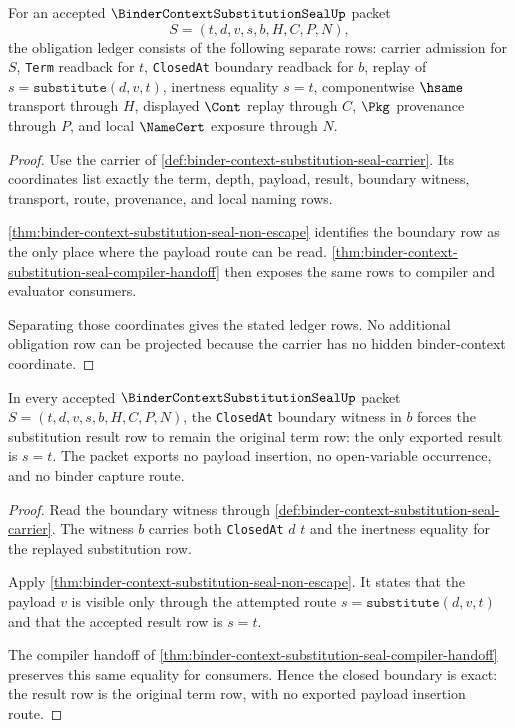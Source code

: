\begin{theorem}
\label{thm:binder-context-substitution-seal-obligation-rows}
For an accepted $\BinderContextSubstitutionSealUp$ packet
$$
S=(t,d,v,s,b,H,C,P,N),
$$
the obligation ledger consists of the following separate rows: carrier admission for $S$, \texttt{Term} readback for $t$, \texttt{ClosedAt} boundary readback for $b$, replay of $s=\texttt{substitute}(d,v,t)$, inertness equality $s=t$, componentwise $\hsame$ transport through $H$, displayed $\Cont$ replay through $C$, $\Pkg$ provenance through $P$, and local $\NameCert$ exposure through $N$.
\end{theorem}
\begin{proof}
Use the carrier of \autoref{def:binder-context-substitution-seal-carrier}. Its coordinates list exactly the term, depth, payload, result, boundary witness, transport, route, provenance, and local naming rows.

\autoref{thm:binder-context-substitution-seal-non-escape} identifies the boundary row as the only place where the payload route can be read. \autoref{thm:binder-context-substitution-seal-compiler-handoff} then exposes the same rows to compiler and evaluator consumers.

Separating those coordinates gives the stated ledger rows. No additional obligation row can be projected because the carrier has no hidden binder-context coordinate.
\end{proof}

\begin{theorem}
\label{thm:binder-context-substitution-seal-closed-boundary-exactness}
In every accepted $\BinderContextSubstitutionSealUp$ packet $S=(t,d,v,s,b,H,C,P,N)$, the \texttt{ClosedAt} boundary witness in $b$ forces the substitution result row to remain the original term row: the only exported result is $s=t$. The packet exports no payload insertion, no open-variable occurrence, and no binder capture route.
\end{theorem}
\begin{proof}
Read the boundary witness through \autoref{def:binder-context-substitution-seal-carrier}. The witness $b$ carries both \texttt{ClosedAt} $d$ $t$ and the inertness equality for the replayed substitution row.

Apply \autoref{thm:binder-context-substitution-seal-non-escape}. It states that the payload $v$ is visible only through the attempted route $s=\texttt{substitute}(d,v,t)$ and that the accepted result row is $s=t$.

The compiler handoff of \autoref{thm:binder-context-substitution-seal-compiler-handoff} preserves this same equality for consumers. Hence the closed boundary is exact: the result row is the original term row, with no exported payload insertion route.
\end{proof}

